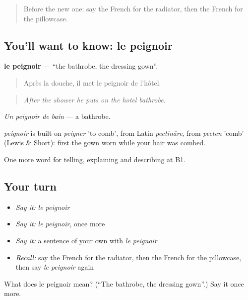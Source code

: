 \label{lesson:FR-C427-peignoir}



\begin{quote}
Before the new one: say the French for the radiator, then the French for the pillowcase.
\end{quote}

\subsection*{You'll want to know: le peignoir}
\textbf{le peignoir} — \textquotedblleft{}the bathrobe, the dressing gown\textquotedblright{}.

\begin{quote}
Après la douche, il met le peignoir de l'hôtel.
\end{quote}

\begin{quote}
\emph{After the shower he puts on the hotel bathrobe.}
\end{quote}

\emph{Un peignoir de bain} — a bathrobe.

\begin{cousinweb}
\emph{peignoir} is built on \emph{peigner} 'to comb', from Latin \emph{pectināre}, from \emph{pecten} 'comb' (Lewis \& Short): first the gown worn while your hair was combed.
\end{cousinweb}

\begin{grammarlens}[title={What you've built}]
One more word for telling, explaining and describing at B1.
\end{grammarlens}

\subsection*{Your turn}
\begin{itemize}
\raggedright
  \item \emph{Say it:} \emph{le peignoir}
  \item \emph{Say it:} \emph{le peignoir}, once more
  \item \emph{Say it:} a sentence of your own with \emph{le peignoir}
  \item \emph{Recall:} say the French for the radiator, then the French for the pillowcase, then say \emph{le peignoir} again
\end{itemize}

\begin{tcolorbox}[breakable,colback=teal!4,colframe=teal!35!black,title={Before you move on}]
What does le peignoir mean? (\textquotedblleft{}The bathrobe, the dressing gown\textquotedblright{}.) Say it once more.
\end{tcolorbox}
